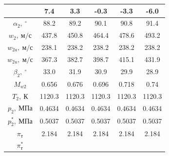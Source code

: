 \documentclass[a4paper,12pt]{article}
\begin{document}
\begin{longtable}{
    |
%    
    c|
%    
    c|
%    
    c|
%    
    c|
%    
    c|
%    
    c|
%    
    }
%        
        & 7.4
%        
        & 3.3
%        
        & -0.3
%        
        & -3.3
%        
        & -6.0
%        
        \\
        \hline
%        
        $\alpha_2,\ ^\circ$
%        
        & 88.2
%        
        & 89.2
%        
        & 90.1
%        
        & 90.8
%        
        & 91.4
%        
        \\
        \hline
%        
        $w_2,\ м/с$
%        
        & 437.8
%        
        & 450.8
%        
        & 464.4
%        
        & 478.6
%        
        & 493.2
%        
        \\
        \hline
%        
        $w_{2a},\ м/с$
%        
        & 238.1
%        
        & 238.2
%        
        & 238.2
%        
        & 238.2
%        
        & 238.2
%        
        \\
        \hline
%        
        $w_{2u},\ м/с$
%        
        & 367.3
%        
        & 382.7
%        
        & 398.7
%        
        & 415.1
%        
        & 431.9
%        
        \\
        \hline
%        
        $\beta_2,\ ^\circ$
%        
        & 33.0
%        
        & 31.9
%        
        & 30.9
%        
        & 29.9
%        
        & 28.9
%        
        \\
        \hline
%        
        $M_{w2}$
%        
        & 0.656
%        
        & 0.676
%        
        & 0.696
%        
        & 0.718
%        
        & 0.74
%        
        \\
        \hline
%        
        $T_2,\ К$
%        
        & 1120.3
%        
        & 1120.3
%        
        & 1120.3
%        
        & 1120.3
%        
        & 1120.3
%        
        \\
        \hline
%        
        $p_2,\ МПа$
%        
        & 0.4634
%        
        & 0.4634
%        
        & 0.4634
%        
        & 0.4634
%        
        & 0.4634
%        
        \\
        \hline
%        
        $p_2^*,\ МПа$
%        
        & 0.5037
%        
        & 0.5037
%        
        & 0.5037
%        
        & 0.5037
%        
        & 0.5037
%        
        \\
        \hline
%        
        $\pi_т$
%        
        & 2.184
%        
        & 2.184
%        
        & 2.184
%        
        & 2.184
%        
        & 2.184
%        
        \\
        \hline
%        
        $\pi_т^*$

\end{longtable}
\end{document}
